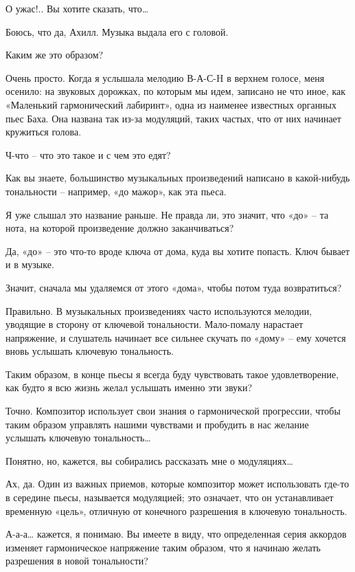 \documentclass[../main.tex]{subfiles}
\begin{document}
\begin{Dialogue}
\begin{sublevel}
\begin{sublevel}
\begin{sublevel}
 О ужас!.. Вы хотите сказать, что\ldots{}

 Боюсь, что да, Ахилл. Музыка выдала его с головой.

 Каким же это образом?

 Очень просто. Когда я услышала мелодию В-А-С-H в верхнем голосе, меня осенило: на звуковых дорожках, по которым мы идем, записано не что иное, как «Маленький гармонический лабиринт», одна из наименее известных органных пьес Баха. Она названа так из-за модуляций, таких частых, что от них начинает кружиться голова.

 Ч-что \--- что это такое и с чем это едят?

 Как вы знаете, большинство музыкальных произведений написано в какой-нибудь тональности \--- например, «до мажор», как эта пьеса.

 Я уже слышал это название раньше. Не правда ли, это значит, что «до» \--- та нота, на которой произведение должно заканчиваться?

 Да, «до» \--- это что-то вроде ключа от дома, куда вы хотите попасть. Ключ бывает и в музыке.

 Значит, сначала мы удаляемся от этого «дома», чтобы потом туда возвратиться?

 Правильно. В музыкальных произведениях часто используются мелодии, уводящие в сторону от ключевой тональности. Мало-помалу нарастает напряжение, и слушатель начинает все сильнее скучать по «дому» \--- ему хочется вновь услышать ключевую тональность.

 Таким образом, в конце пьесы я всегда буду чувствовать такое удовлетворение, как будто я всю жизнь желал услышать именно эти звуки?

 Точно. Композитор использует свои знания о гармонической прогрессии, чтобы таким образом управлять нашими чувствами и пробудить в нас желание услышать ключевую тональность\ldots{}

 Понятно, но, кажется, вы собирались рассказать мне о модуляциях\ldots{}

 Ах, да. Один из важных приемов, которые композитор может использовать где-то в середине пьесы, называется модуляцией; это означает, что он устанавливает временную «цель», отличную от конечного разрешения в ключевую тональность.

 А-а-а\ldots{} кажется, я понимаю. Вы имеете в виду, что определенная серия аккордов изменяет гармоническое напряжение таким образом, что я начинаю желать разрешения в новой тональности?


\end{sublevel}
\end{sublevel}
\end{sublevel}
\end{Dialogue}
\end{document}
